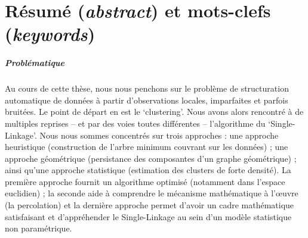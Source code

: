 \chapter{Résumé (\emph{abstract}) et mots-clefs (\emph{keywords})}



\begin{AbstractPage}

\small

\begin{resume}



\paragraph{Problématique}
Au cours de cette thèse, nous nous penchons sur le problème de structuration automatique de données à partir d'observations locales, imparfaites et parfois bruitées. 
Le point de départ en est le `clustering'. %
Nous avons alors rencontré à de multiples reprises -- et par des voies toutes différentes -- l'algorithme du `Single-Linkage'.
Nous nous sommes concentrés sur trois approches %
: une approche heuristique (construction de l'arbre minimum couvrant sur les données) ; une approche géométrique (persistance des composantes d'un graphe géométrique) ; ainsi qu'une approche statistique (estimation des clusters de forte densité).
La première approche  fournit un algorithme optimisé (notamment dans l'espace euclidien) ; la seconde aide à comprendre le mécanisme mathématique à l'œuvre (la percolation) et la dernière approche permet d'avoir un cadre mathématique satisfaisant et d'appréhender le Single-Linkage au sein d'un modèle statistique non paramétrique.



\end{resume}
\end{AbstractPage}
